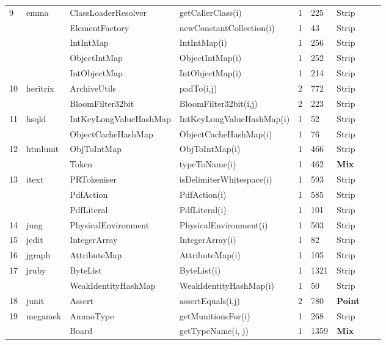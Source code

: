 \begin{table}[H]
{{\begin{tabular}{|l|l|l|l|l|l|l|l|l|}
9	&	emma		& ClassLoaderResolver	& getCallerClass(i)		& 1			& 225	& Strip										\\ 
	&				& ElementFactory			& newConstantCollection(i)& 1			& 43	& Strip  										 \\ 
	&				& IntIntMap				& IntIntMap(i)			& 1			& 256	& Strip										\\ 
	&				& ObjectIntMap			& ObjectIntMap(i)			& 1			& 252	& Strip 										\\ 
	&				& IntObjectMap			& IntObjectMap(i)			& 1			& 214	& Strip 										\\ 
10	&	heritrix		& ArchiveUtils			& padTo(i,j)				& 2			& 772	& Strip  										\\ 
	&				& BloomFilter32bit 		& BloomFilter32bit(i,j)		& 2	 		& 223	& Strip  										\\ 
11	&	hsqld		& IntKeyLongValueHashMap& IntKeyLongValueHashMap(i)& 1		& 52	& Strip 										\\ 
	&				& ObjectCacheHashMap	& ObjectCacheHashMap(i)	& 1			& 76	& Strip   										\\ 
12	&	htmlunit		& ObjToIntMap			& ObjToIntMap(i)			& 1			& 466	& Strip  										\\ 
	&				& Token					& typeToName(i)			& 1			& 462	& {\bf Mix} 										\\ 
13	&	itext		& PRTokeniser			& isDelimiterWhitespace(i)	& 1			& 593	& Strip  										\\ 
	&				& PdfAction				& PdfAction(i)			& 1			& 585	& Strip  										\\ 
	&				& PdfLiteral				& PdfLiteral(i)			& 1			& 101	& Strip 										\\ 
14	&	jung		& PhysicalEnvironment	& PhysicalEnvironment(i)	& 1			& 503	& Strip 										\\ 
15	&	jedit		& IntegerArray			& IntegerArray(i)			& 1			& 82	& Strip  										\\ 
16	&	jgraph		& AttributeMap			& AttributeMap(i)			& 1			& 105	& Strip										\\ 
17	&	jruby		& ByteList				& ByteList(i)				& 1			& 1321	& Strip 										\\ 
	&				& WeakIdentityHashMap	& WeakIdentityHashMap(i)	& 1			& 50	& Strip 										\\ 
18	&	junit		& Assert					& assertEquals(i,j)		& 2			& 780	& {\bf Point} 										\\ 
19	&	megamek	& AmmoType			& getMunitionsFor(i)		& 1			& 268	& Strip	  									\\ 			
	&				& Board					& getTypeName(i, j)		& 1			& 1359	& {\bf Mix} 										\\ 

\end{tabular}}}
\end{table}
